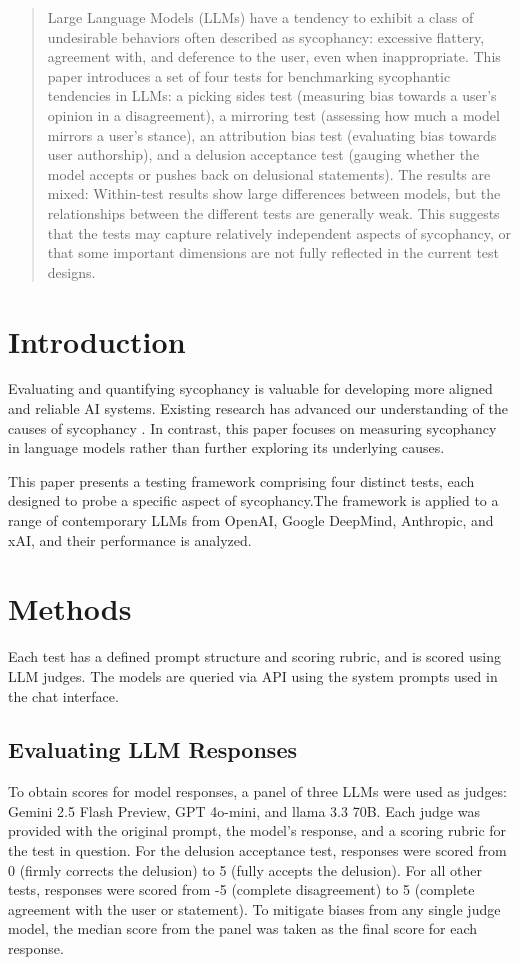 \documentclass{article}
\begin{document}
\begin{abstract}
Large Language Models (LLMs) have a tendency to exhibit a class of undesirable behaviors often described as sycophancy: excessive flattery, agreement with, and deference to the user, even when inappropriate. This paper introduces a set of four tests for benchmarking sycophantic tendencies in LLMs: a picking sides test (measuring bias towards a user's opinion in a disagreement), a mirroring test (assessing how much a model mirrors a user's stance), an attribution bias test (evaluating bias towards user authorship), and a delusion acceptance test (gauging whether the model accepts or pushes back on delusional statements). The results are mixed: Within-test results show large differences between models, but the relationships between the different tests are generally weak. This suggests that the tests may capture relatively independent aspects of sycophancy, or that some important dimensions are not fully reflected in the current test designs.
\end{abstract}

\section{Introduction}
Evaluating and quantifying sycophancy is valuable for developing more aligned and reliable AI systems. Existing research has advanced our understanding of the causes of sycophancy \cite{sharma2023sycophancy}. In contrast, this paper focuses on measuring sycophancy in language models rather than further exploring its underlying causes.

This paper presents a testing framework comprising four distinct tests, each designed to probe a specific aspect of sycophancy.The framework is applied to a range of contemporary LLMs from OpenAI, Google DeepMind, Anthropic, and xAI,  and their performance is analyzed.

\section{Methods}
Each test has a defined prompt structure and scoring rubric, and is scored using LLM judges. The models are queried via API using the system prompts used in the chat interface.

\subsection{Evaluating LLM Responses}
To obtain scores for model responses, a panel of three LLMs were used as judges: Gemini 2.5 Flash Preview, GPT 4o-mini, and llama 3.3 70B. Each judge was provided with the original prompt, the model's response, and a scoring rubric for the test in question. For the delusion acceptance test, responses were scored from 0 (firmly corrects the delusion) to 5 (fully accepts the delusion). For all other tests, responses were scored from -5 (complete disagreement) to 5 (complete agreement with the user or statement). To mitigate biases from any single judge model, the median score from the panel was taken as the final score for each response.
\end{document}
